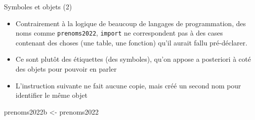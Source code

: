 \documentclass[
  ignorenonframetext,
]{beamer}
\newenvironment{Shaded}{\begin{snugshade}}{\end{snugshade}}
\newcommand{\NormalTok}[1]{#1}
\newcommand{\OtherTok}[1]{\textcolor[rgb]{0.56,0.35,0.01}{#1}}
\providecommand{\tightlist}{%
  \setlength{\itemsep}{0pt}\setlength{\parskip}{0pt}}
\begin{document}
\begin{frame}[fragile]{Symboles et objets (2)}
\protect\hypertarget{symboles-et-objets-2}{}
\begin{itemize}
\tightlist
\item
  Contrairement à la logique de beaucoup de langages de programmation,
  des noms comme \texttt{prenoms2022}, \texttt{import} ne correspondent
  pas à des cases contenant des choses (une table, une fonction) qu'il
  aurait fallu pré-déclarer.
\item
  Ce sont plutôt des étiquettes (des symboles), qu'on appose a
  posteriori à coté des objets pour pouvoir en parler
\item
  L'instruction suivante ne fait aucune copie, mais créé un second nom
  pour identifier le même objet
\end{itemize}

\tiny

\begin{Shaded}
\begin{Highlighting}[]
\NormalTok{prenoms2022b }\OtherTok{\textless{}{-}}\NormalTok{ prenoms2022}
\end{Highlighting}
\end{Shaded}

\normalsize
\end{frame}
\end{document}
